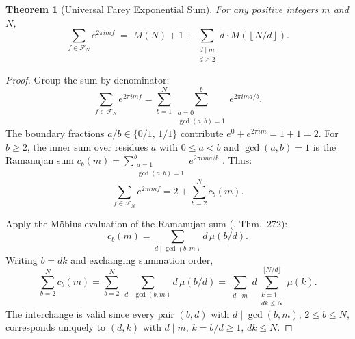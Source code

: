 \documentclass[11pt]{article}
\newtheorem{theorem}{Theorem}[section]
\theoremstyle{definition}
\newcommand{\F}{\mathcal{F}}
\begin{document}
\begin{theorem}[Universal Farey Exponential Sum]\label{thm:universal}
For any positive integers $m$ and $N$,
\begin{equation}
  \sum_{f \in \F_N} e^{2\pi i m f}
  \;=\; M(N) + 1
  + \sum_{\substack{d \mid m \\ d \ge 2}} d \cdot M\!\left(\left\lfloor N/d \right\rfloor\right).
\end{equation}
\end{theorem}

\begin{proof}
Group the sum by denominator:
\begin{equation*}
\sum_{f \in \F_N} e^{2\pi i m f}
= \sum_{b=1}^{N} \sum_{\substack{a=0 \\ \gcd(a,b)=1}}^{b}
e^{2\pi i m a/b}.
\end{equation*}
The boundary fractions $a/b \in \{0/1,\, 1/1\}$ contribute
$e^0 + e^{2\pi im} = 1 + 1 = 2$.
For $b \ge 2$, the inner sum over residues $a$ with
$0 \le a < b$ and $\gcd(a,b)=1$ is the Ramanujan sum
$c_b(m) = \sum_{\substack{a=1\\ \gcd(a,b)=1}}^{b} e^{2\pi i m a/b}$
\cite{Ramanujan1918}.  Thus:
\begin{equation*}
\sum_{f \in \F_N} e^{2\pi i m f} = 2 + \sum_{b=2}^{N} c_b(m).
\end{equation*}

Apply the Möbius evaluation of the Ramanujan sum
(\cite{HardyWright2008}, Thm.~272):
\begin{equation*}
c_b(m) = \sum_{d \mid \gcd(b,m)} d\,\mu(b/d).
\end{equation*}
Writing $b = dk$ and exchanging summation order,
\begin{equation*}
\sum_{b=2}^{N} c_b(m)
= \sum_{b=2}^{N}\ \sum_{d \mid \gcd(b,m)} d\,\mu(b/d)
= \sum_{\substack{d \mid m}} d \sum_{\substack{k=1 \\ dk \le N}}^{\lfloor N/d \rfloor} \mu(k).
\end{equation*}
The interchange is valid since every pair $(b,d)$ with $d \mid \gcd(b,m)$,
$2 \le b \le N$, corresponds uniquely to $(d,k)$ with $d \mid m$, $k = b/d \ge 1$,
$dk \le N$.


\end{proof}
\end{document}
